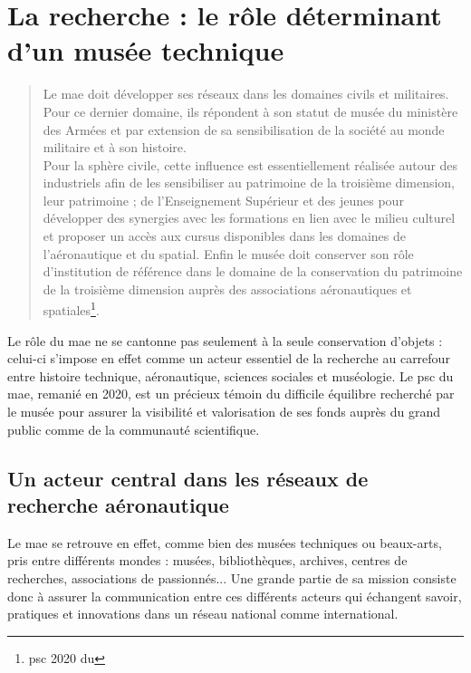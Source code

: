 \section{\label{I-A-2}La recherche : le rôle déterminant d'un musée technique}

\begin{quote}
	\og Le \acf{mae} doit développer ses réseaux \textelp{} dans les domaines civils et militaires. Pour ce dernier domaine, ils répondent à son statut de musée du ministère des Armées et par extension de sa sensibilisation de la société au monde militaire et à son histoire.\\
	Pour la sphère civile, cette influence est essentiellement réalisée autour des industriels afin de les sensibiliser au patrimoine de la troisième dimension, leur patrimoine ; de l’Enseignement Supérieur et des jeunes pour développer des synergies avec les formations en lien avec le milieu culturel et proposer un accès aux cursus disponibles dans les domaines de l’aéronautique et du spatial. Enfin \textelp{} le musée doit conserver son rôle d’institution de référence dans le domaine de la conservation du patrimoine de la troisième dimension auprès des associations aéronautiques et spatiales\footnote{\Ac{psc} 2020 du \mae}.\fg
\end{quote}


Le rôle du \ac{mae} ne se cantonne pas seulement à la seule conservation d’objets : celui-ci s'impose en effet comme un acteur essentiel de la recherche au carrefour entre histoire technique, aéronautique, sciences sociales et muséologie.  Le \ac{psc} du \acf{mae}, remanié en 2020, est un précieux témoin du difficile équilibre recherché par le musée pour assurer la visibilité et valorisation de ses fonds auprès du grand public comme de la communauté scientifique.

\subsection{Un acteur central dans les réseaux de recherche aéronautique}

Le \ac{mae} se retrouve en effet, comme bien des musées techniques ou beaux-arts, pris entre différents mondes : musées, bibliothèques, archives, centres de recherches, associations de passionnés... Une grande partie de sa mission consiste donc à assurer la communication entre ces différents acteurs qui échangent savoir, pratiques et innovations dans un réseau national comme international.


